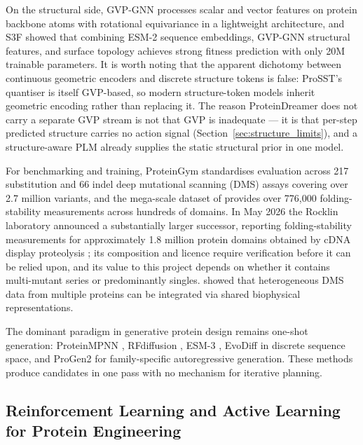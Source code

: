 \documentclass[12pt, a4paper]{article}
\begin{document}
On the structural side, GVP-GNN \citep{jing2021gvp} processes scalar and vector features on protein backbone atoms with rotational equivariance in a lightweight architecture, and S3F \citep{zhang2024s3f} showed that combining ESM-2 sequence embeddings, GVP-GNN structural features, and surface topology achieves strong fitness prediction with only 20M trainable parameters. It is worth noting that the apparent dichotomy between continuous geometric encoders and discrete structure tokens is false: ProSST's quantiser is itself GVP-based, so modern structure-token models inherit geometric encoding rather than replacing it. The reason ProteinDreamer does not carry a separate GVP stream is not that GVP is inadequate --- it is that per-step predicted structure carries no action signal (Section~\ref{sec:structure_limits}), and a structure-aware PLM already supplies the static structural prior in one model.

For benchmarking and training, ProteinGym \citep{notin2023proteingym} standardises evaluation across 217 substitution and 66 indel deep mutational scanning (DMS) assays covering over 2.7 million variants, and the mega-scale dataset of \citet{tsuboyama2023megascale} provides over 776{,}000 folding-stability measurements across hundreds of domains. In May 2026 the Rocklin laboratory announced a substantially larger successor, reporting folding-stability measurements for approximately 1.8 million protein domains obtained by cDNA display proteolysis \citep{rocklin2026stability}; its composition and licence require verification before it can be relied upon, and its value to this project depends on whether it contains multi-mutant series or predominantly singles. \citet{chen2023dmslandscapes} showed that heterogeneous DMS data from multiple proteins can be integrated via shared biophysical representations.

The dominant paradigm in generative protein design remains one-shot generation: ProteinMPNN \citep{dauparas2022proteinmpnn}, RFdiffusion \citep{watson2023rfdiffusion}, ESM-3 \citep{hayes2024esm3}, EvoDiff \citep{alamdari2023evodiff} in discrete sequence space, and ProGen2 \citep{nijkamp2023progen2} for family-specific autoregressive generation. These methods produce candidates in one pass with no mechanism for iterative planning.

\subsection{Reinforcement Learning and Active Learning for Protein Engineering}
\end{document}
